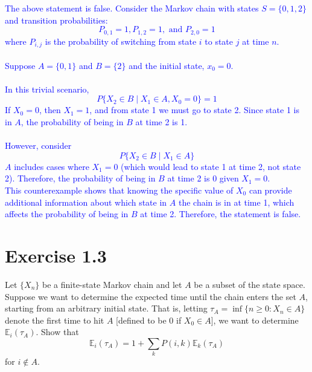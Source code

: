 \documentclass{article}
\begin{document}
\begin{enumerate}
    \textcolor{blue}{The above statement is false. Consider the Markov chain
    with states $S = \{0, 1, 2\}$ and transition probabilities: $$P_{0,1}=1,
    P_{1,2}=1, \text{ and } P_{2,0}=1$$where $P_{i,j}$ is the probability of switching
from state $i$ to state $j$ at time $n$. \\ \\ Suppose $A=\{0,1\}$ and $B=\{2\}$ and the initial state, $x_0=0$. \\ \\
In this trivial scenario,
$$P\{X_2 \in B \mid X_1 \in A, X_0 = 0\} = 1$$
If $X_0 = 0$, then $X_1 = 1$, and from state 1 we must go to state 2. Since state 1 is in $A$, the probability of being in $B$ at time 2 is 1. \\
\\However, consider
$$P\{X_2 \in B \mid X_1 \in A\}$$$A$ includes cases where $X_1 = 0$ (which would lead to state 1 at time 2, not state 2).
Therefore, the probability of being in $B$ at time 2 is 0 given $X_1 = 0$. \\
This counterexample shows that knowing the specific value of $X_0$ can provide additional information about which state in $A$ the chain is in at time 1, which affects the probability of being in $B$ at time 2.
Therefore, the statement is false.}

\end{enumerate}

\section*{Exercise 1.3} 
Let $\{X_n\}$ be a finite-state Markov chain
and let $A$ be a subset of the state space. Suppose we want to
determine the expected time until the chain enters the set $A$,
starting from an arbitrary initial state. That is, letting $\tau_A =
\inf\{n \geq 0 : X_n \in A\}$ denote the first time to hit $A$
[defined to be $0$ if $X_0 \in A$], we want to determine
$\mathbb{E}_i(\tau_A)$. Show that \[ \mathbb{E}_i(\tau_A) = 1 + \sum_k P(i, k)
\mathbb{E}_k(\tau_A) \] for $i \notin A$.
\end{document}
